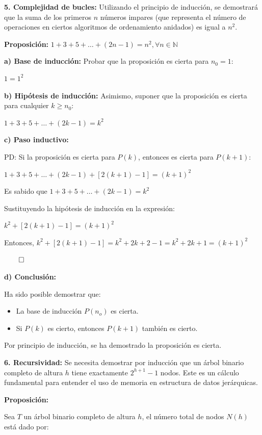 \documentclass{article}
\begin{document}
\textbf{5. Complejidad de bucles:} Utilizando el principio de inducción, se demostrará que la suma de los primeros $n$ números impares (que representa el número de operaciones en ciertos algoritmos de ordenamiento anidados) es igual a $n^2$.

\textbf{Proposición:} $1 + 3 + 5 + \dots + (2n - 1) = n^2, \forall n \in \mathbb{N}$

\textbf{a) Base de inducción:} Probar que la proposición es cierta para $n_0  = 1$:

$1 = 1^2$

\textbf{b) Hipótesis de inducción:} Asimismo, suponer que la proposición es cierta para cualquier $k \ge n_0$:

$1 + 3 + 5 + \dots + (2k - 1) = k^2$

\textbf{c) Paso inductivo:}

PD: Si la proposición es cierta para $P(k)$, entonces es cierta para $P(k + 1)$:

$1 + 3 + 5 + \dots + (2k - 1) + \left[2(k + 1) - 1\right] = (k + 1)^2$

Es sabido que $1 + 3 + 5 + \dots + (2k - 1) = k^2$ 

Sustituyendo la hipótesis de inducción en la expresión:

$k^2 + \left[2(k + 1) - 1\right] = (k + 1)^2$

Entonces, $k^2 + \left[2(k + 1) - 1\right] = k^2 + 2k + 2 - 1 = k^2 + 2k + 1 = (k + 1)^2$

$\qed$

\textbf{d) Conclusión:}

Ha sido posible demostrar que:

\begin{itemize}
    \item La base de inducción $P(n_o)$ es cierta.
    \item Si $P(k)$ es cierto, entonces $P(k + 1)$ también es cierto.
\end{itemize}

Por principio de inducción, se ha demostrado la proposición es cierta.

\textbf{6. Recursividad:} Se necesita demostrar por inducción que un árbol binario completo de altura $h$ tiene exactamente $2^{h + 1} - 1$ nodos. Este es un cálculo fundamental para entender el uso de memoria en estructura de datos jerárquicas.

\textbf{Proposición:} 

Sea $T$ un árbol binario completo de altura $h$, el número total de nodos $N(h)$ está dado por:
\end{document}
